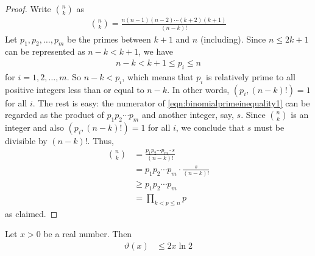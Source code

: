	\begin{proof}
		Write $\binom{n}{k}$ as
			\begin{align}
				\label{eqn:binomialprimeinequality1}
				\binom{n}{k} = \frac{n(n-1)(n-2) \cdots (k+2)(k+1)}{(n-k)!}
			\end{align}
		Let $p_1, p_2, \ldots, p_m$ be the primes between $k+1$ and $n$ (including). Since $n \leq 2k+1$ can be represented as $n-k < k+1$, we have
			\begin{align*}
				n-k < k+1 \leq p_i \leq n
			\end{align*}
		for $i=1,2,\ldots,m$. So $n-k < p_i$, which means that $p_i$ is relatively prime to all positive integers less than or equal to $n-k$. In other words, $(p_i, (n-k)!)=1$ for all $i$. The rest is easy: the numerator of \eqref{eqn:binomialprimeinequality1} can be regarded as the product of $p_1p_2\cdots p_m$ and another integer, say, $s$. Since $\binom{n}{k}$ is an integer and also $(p_i, (n-k)!)=1$ for all $i$, we conclude that $s$ must be divisible by $(n-k)!$. Thus,
			\begin{align*}
			\binom{n}{k}
				& = \frac{p_1p_2\cdots p_m \cdot s}{(n-k)!}\\
				& = p_1p_2\cdots p_m \cdot \frac{s}{(n-k)!}\\
				& \geq p_1p_2\cdots p_m\\
				& = \prod_{k < p \leq n} p
			\end{align*}
		as claimed.
	\end{proof}

	\begin{proposition}
		\label{prop:chebyshevthetainequality}
		Let $x >0$ be a real number. Then
			\begin{align}
				\vartheta(x)
					& \leq 2x \ln 2\label{eqn:chebyshevthetainequality1}
			\end{align}
	\end{proposition}

